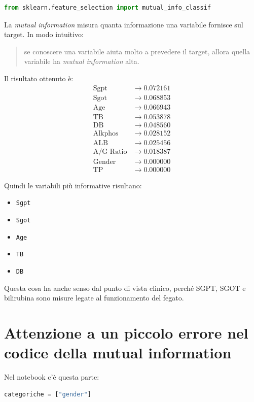 \documentclass[11pt,a4paper]{article}
\begin{document}
\begin{lstlisting}[language=Python]
from sklearn.feature_selection import mutual_info_classif
\end{lstlisting}

La \textit{mutual information} misura quanta informazione una variabile fornisce sul target. In modo intuitivo:
\begin{quote}
    se conoscere una variabile aiuta molto a prevedere il target, allora quella variabile ha \textit{mutual information} alta.
\end{quote}

Il risultato ottenuto è:
\begin{align*}
    \text{Sgpt}        &\rightarrow 0.072161 \\
    \text{Sgot}        &\rightarrow 0.068853 \\
    \text{Age}         &\rightarrow 0.066943 \\
    \text{TB}          &\rightarrow 0.053878 \\
    \text{DB}          &\rightarrow 0.048560 \\
    \text{Alkphos}     &\rightarrow 0.028152 \\
    \text{ALB}         &\rightarrow 0.025456 \\
    \text{A/G Ratio}   &\rightarrow 0.018387 \\
    \text{Gender}      &\rightarrow 0.000000 \\
    \text{TP}          &\rightarrow 0.000000
\end{align*}

Quindi le variabili più informative risultano:
\begin{itemize}
    \item \texttt{Sgpt}
    \item \texttt{Sgot}
    \item \texttt{Age}
    \item \texttt{TB}
    \item \texttt{DB}
\end{itemize}

Questa cosa ha anche senso dal punto di vista clinico, perché SGPT, SGOT e bilirubina sono misure legate al funzionamento del fegato.

\section{Attenzione a un piccolo errore nel codice della mutual information}
Nel notebook c'è questa parte:
\begin{lstlisting}[language=Python]
categoriche = ["gender"]
\end{lstlisting}
\end{document}
